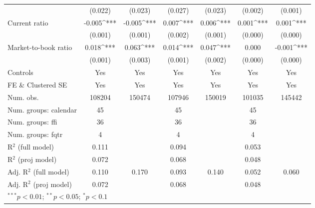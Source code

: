 \begin{sidewaystable}[h]
\begin{center}
{\begin{tabular}{l S[table-format=6.6] S[table-format=6.6] S[table-format=6.6] S[table-format=6.6] S[table-format=6.6] S[table-format=6.6]}
                                    & (0.022)      & (0.023)      & (0.027)      & (0.023)      & (0.002)      & (0.001)      \\
Current ratio                       & -0.005^{***} & -0.005^{***} & 0.007^{***}  & 0.006^{***}  & 0.001^{***}  & 0.001^{***}  \\
                                    & (0.001)      & (0.001)      & (0.002)      & (0.001)      & (0.000)      & (0.000)      \\
Market-to-book ratio                & 0.018^{***}  & 0.063^{***}  & 0.014^{***}  & 0.047^{***}  & 0.000        & -0.001^{***} \\
                                    & (0.001)      & (0.003)      & (0.001)      & (0.002)      & (0.000)      & (0.000)      \\
\midrule
Controls                            & {Yes}        & {Yes}        & {Yes}        & {Yes}        & {Yes}        & {Yes}        \\
FE \& Clustered SE                  & {Yes}        & {Yes}        & {Yes}        & {Yes}        & {Yes}        & {Yes}        \\
Num. obs.                           & 108204       & 150474       & 107946       & 150019       & 101035       & 145442       \\
Num. groups: calendar               & 45           &              & 45           &              & 45           &              \\
Num. groups: ffi                    & 36           &              & 36           &              & 36           &              \\
Num. groups: fqtr                   & 4            &              & 4            &              & 4            &              \\
R$^2$ (full model)                  & 0.111        &              & 0.094        &              & 0.053        &              \\
R$^2$ (proj model)                  & 0.072        &              & 0.068        &              & 0.048        &              \\
Adj. R$^2$ (full model)             & 0.110        & 0.170        & 0.093        & 0.140        & 0.052        & 0.060        \\
Adj. R$^2$ (proj model)             & 0.072        &              & 0.068        &              & 0.048        &              \\
\bottomrule
{}
\end{tabular}}
\label{regcompare}
\end{center}
\end{sidewaystable}
